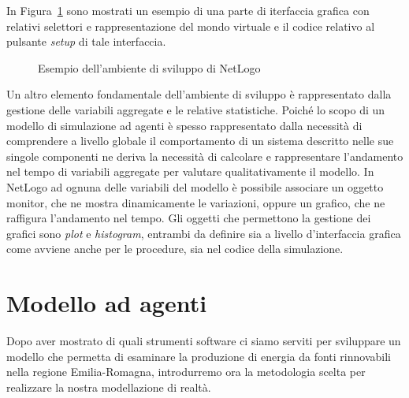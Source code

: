 In Figura~\ref{netlogoUI_code} sono mostrati un esempio di una parte di iterfaccia grafica con relativi selettori e rappresentazione del mondo virtuale e il codice relativo al pulsante \emph{setup} di tale interfaccia.

\begin{figure}[H]
	\centering
	\quad 
	\caption{Esempio dell'ambiente di sviluppo di NetLogo}
	\label{netlogoUI_code}
\end{figure}

Un altro elemento fondamentale dell'ambiente di sviluppo è rappresentato dalla gestione delle variabili aggregate e le relative statistiche. Poiché lo scopo di un modello di simulazione ad agenti è spesso rappresentato dalla necessità di comprendere a livello globale il comportamento di un sistema descritto nelle sue singole componenti ne deriva la necessità di calcolare e rappresentare l'andamento nel tempo di variabili aggregate per valutare qualitativamente il modello. In NetLogo ad ognuna delle variabili del modello è possibile associare un oggetto monitor, che ne mostra dinamicamente le variazioni, oppure un grafico, che ne raffigura l'andamento nel tempo. Gli  oggetti che permettono la gestione dei grafici sono \emph{plot} e \emph{histogram}, entrambi da definire sia a livello d'interfaccia grafica come avviene anche per le procedure, sia nel codice della simulazione.


\section{Modello ad agenti}

Dopo aver mostrato di quali strumenti software ci siamo serviti per sviluppare un modello che permetta di esaminare la produzione di energia da fonti rinnovabili nella regione Emilia-Romagna, introdurremo ora la metodologia scelta per realizzare la nostra modellazione di realtà.

